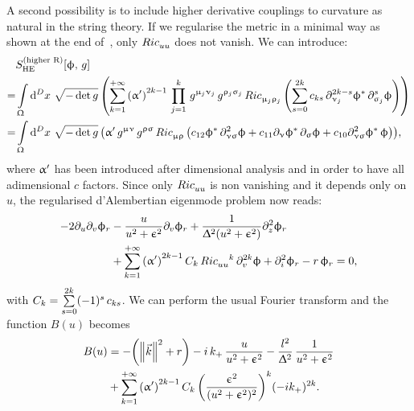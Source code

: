 A second possibility is to include higher derivative couplings to curvature as natural in the string theory.
If we regularise the metric in a minimal way as shown at the end of~, only $\tensor{Ric}{_u_u}$ does not vanish.
We can introduce:
\begin{equation}
  \begin{split}
    &
    S_{\mathrm{HE}}^{(\text{higher R})}\qty[ \phi,\, g ]
    \\
    = &
    \int\limits_{\Omega} \dd[D]{x}\,
    \sqrt{- \det g}\,
    \qty(%
      \finitesum{k}{1}{+\infty}
      \qty(\ap)^{2 k-1}\,
      \finiteprod{j}{1}{k}\,
      g^{\mu_j \nu_j}\, g^{\rho_j\sigma_j}\,
      \tensor{Ric}{_{\mu_j}_{\rho_j}}\,
      \qty(%
        \finitesum{s}{0}{2k}
        c_{k s}\, \ipd{\nu_j}^{2k - s}\phi^*\, \ipd{\sigma_j}^s \phi
      )
    )
    \\
    = &
    \int\limits_{\Omega} \dd[D]{x}\,
    \sqrt{- \det g}\,
    \qty(%
      \ap\,
      g^{\mu\nu}\, g^{\rho\sigma}\,
      \tensor{Ric}{_{\mu}_{\rho}}\,
      \qty(%
        c_{12}
        \phi^*\, \ipd{\nu\sigma}^2 \phi
        +
        c_{11}
        \ipd{\nu} \phi^*\, \ipd{\sigma} \phi
        +
        c_{10}
        \ipd{\nu\sigma}^2 \phi^*\, \phi
      )
    ),
  \end{split}
\end{equation}
where $\upalpha'$ has been introduced after dimensional analysis and in order to have all adimensional $c$ factors.
Since only $\tensor{Ric}{_u_u}$ is non vanishing and it depends only on $u$,
the regularised d'Alembertian eigenmode problem now reads:
\begin{equation}
  \begin{split}
    -
    2 \ipd{u} \ipd{v} \phi_r
    & -
    \frac{u}{u^2 + \epsilon^2} \ipd{v} \phi_r
    +
    \frac{1}{\Delta^2 (u^2+ \epsilon^2)} \ipd{z}^2 \phi_r
    \\
    & +
    \finitesum{k}{1}{+\infty} \qty(\ap)^{2k-1}\,
    C_k\,
    \tensor{Ric}{_u_u}^k\,
    \ipd{v}^{2k} \phi
    +
    \ipd{i}^2 \phi_r
    -
    r\, \phi_r
    =
    0,
  \end{split}
\end{equation}
with $C_k = \sum\limits_{s = 0}^{2k} (-1)^s\, c_{k s}$.
We can perform the usual Fourier transform and the function $B(u)$ becomes
\begin{equation}
  \begin{split}
    B(u)
    & =
    -
    \qty(\norm{\vec{k}}^2 + r)
    -
    i\, k_+\, \frac{u}{u^2 + \upepsilon^2}
    -
    \frac{l^2}{\Updelta^2}\, \frac{1}{u^2+\upepsilon^2}
    \\
    & +
    \sum\limits_{k = 1}^{+\infty}
    \qty(\upalpha')^{2k-1}\,
    C_k\,
    \qty(\frac{\upepsilon^2}{(u^2 + \upepsilon^2)^2})^k
    (-i k_+)^{2k}.
  \end{split}
\end{equation}

